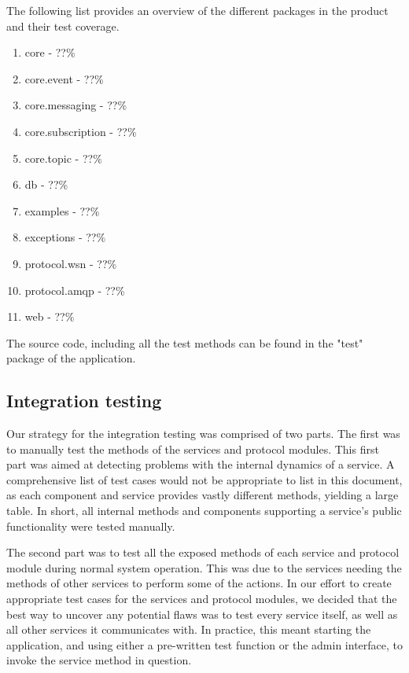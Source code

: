 The following list provides an overview of the different packages in the product and their test coverage.

\begin{enumerate}
\item core - ??\%
\item core.event - ??\%
\item core.messaging - ??\%
\item core.subscription - ??\%
\item core.topic - ??\%
\item db - ??\%
\item examples - ??\%
\item exceptions - ??\%
\item protocol.wsn - ??\%
\item protocol.amqp - ??\%
\item web - ??\%
\end{enumerate}

The source code, including all the test methods can be found in the "test" package of the application.

\subsection{Integration testing}
\label{subsec:testing-test_execution-integration_testing}

Our strategy for the integration testing was comprised of two parts. The first was to manually test the methods of the services and protocol modules. This first part was aimed at detecting problems with the internal dynamics of a service. A comprehensive list of test cases would not be appropriate to list in this document, as each component and service provides vastly different methods, yielding a large table. In short, all internal methods and components supporting a service's public functionality were tested manually.

The second part was to test all the exposed methods of each service and protocol module during normal system operation. This was due to the services needing the methods of other services to perform some of the actions. In our effort to create appropriate test cases for the services and protocol modules, we decided that the best way to uncover any potential flaws was to test every service itself, as well as all other services it communicates with. In practice, this meant starting the application, and using either a pre-written test function or the admin interface, to invoke the service method in question.

